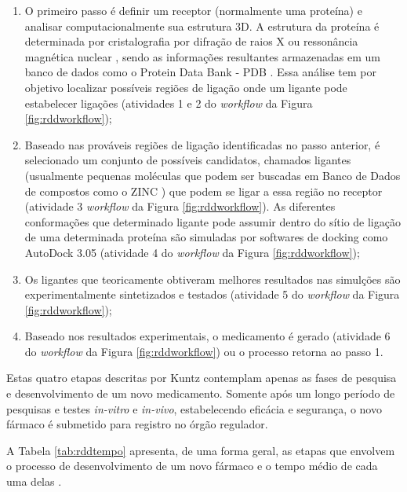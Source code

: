 \begin{enumerate}
  \item O primeiro passo é definir um receptor (normalmente uma proteína) \cite{dre00} e analisar computacionalmente sua estrutura 3D. A estrutura da proteína é determinada por cristalografia por difração de raios X ou ressonância magnética nuclear \cite{far99}, sendo as informações resultantes armazenadas em um banco de dados como o Protein Data Bank - PDB \cite{ber00}. Essa análise tem por objetivo localizar possíveis regiões de ligação onde um ligante pode estabelecer ligações (atividades 1 e 2 do \emph{workflow} da Figura \ref{fig:rddworkflow});
  
  \item Baseado nas prováveis regiões de ligação identificadas no passo anterior, é selecionado um conjunto de possíveis candidatos, chamados ligantes (usualmente pequenas moléculas que podem ser buscadas em Banco de Dados de compostos como o ZINC \cite{irw05}) que podem se ligar a essa região no receptor (atividade 3 \emph{workflow} da Figura \ref{fig:rddworkflow}). As diferentes conformações que determinado ligante pode assumir dentro do sítio de ligação de uma determinada proteína são simuladas por softwares de docking como AutoDock 3.05 \cite{mor98} (atividade 4 do \emph{workflow} da Figura \ref{fig:rddworkflow});
  
  \item Os ligantes que teoricamente obtiveram melhores resultados nas simulções são experimentalmente sintetizados e testados (atividade 5 do \emph{workflow} da Figura \ref{fig:rddworkflow});
  
  \item Baseado nos resultados experimentais, o medicamento é gerado (atividade 6 do \emph{workflow} da Figura \ref{fig:rddworkflow}) ou o processo retorna ao passo 1.
  
\end{enumerate}
  
  Estas quatro etapas descritas por Kuntz \cite{kun92} contemplam apenas as fases de pesquisa e desenvolvimento de um novo medicamento. 
Somente após um longo período de pesquisas e testes \emph{in-vitro} e \emph{in-vivo}, estabelecendo eficácia e segurança, o novo fármaco é submetido para registro no órgão regulador.

A Tabela \ref{tab:rddtempo} apresenta, de uma forma geral, as etapas que envolvem o processo de desenvolvimento de um novo fármaco e o tempo médio de cada uma delas \cite{kun92}.

